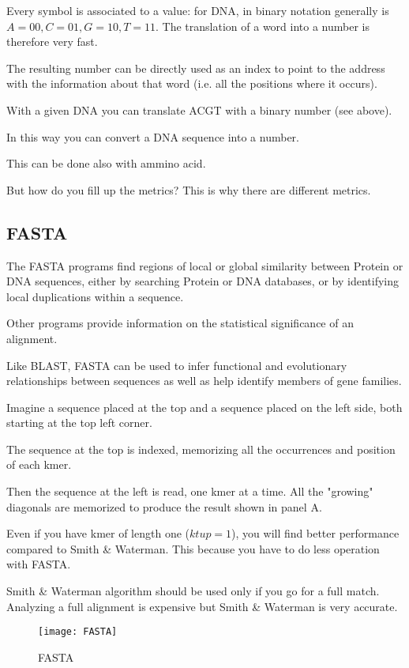 Every symbol is associated to a value: for DNA, in binary notation
generally is $A=00, C=01, G=10, T=11$. The translation of a word into a
number is therefore very fast.

The resulting number can be directly used as an index to point
to the address with the information about that word (i.e. all the positions
where it occurs).

With a given DNA you can translate ACGT with a binary number (see above).

In this way you can convert a DNA sequence into a number. 

This can be done also with ammino acid.

But how do you fill up the metrics? This is why there are different metrics.

\subsection{FASTA}

The FASTA programs find regions of local or global similarity between
Protein or DNA sequences, either by searching Protein or DNA databases, or by
identifying local duplications within a sequence. 

Other programs provide information on the statistical significance of an
alignment. 

Like BLAST, FASTA can be used to infer functional and evolutionary relationships 
between sequences as well as help identify members of gene families.

Imagine a sequence placed at the top and a sequence placed on the left side,
both starting at the top left corner.

The sequence at the top is indexed, memorizing all the occurrences and
position of each kmer. 

Then the sequence at the left is read, one kmer at a time.
All the "growing" diagonals are memorized to produce the result shown
in panel A.

Even if you have kmer of length one ($ktup = 1$), you will find better
performance compared to Smith \& Waterman. This because you have to do less
operation with FASTA.

Smith \& Waterman algorithm should be used only if you go for a full match.
Analyzing a full alignment is expensive but Smith \& Waterman 
is very accurate.

\begin{figure}[H]
  \centering
  \texttt{[image: FASTA]}
  \caption{FASTA}
\end{figure}

